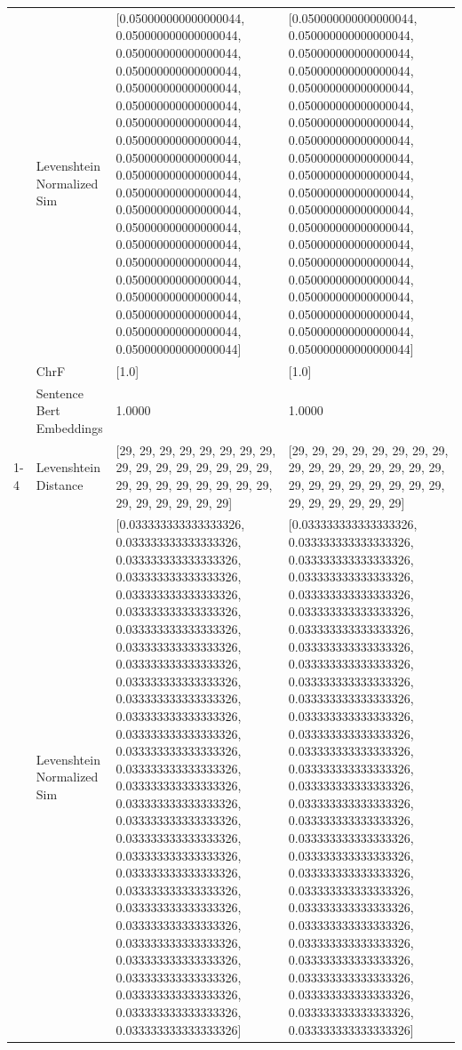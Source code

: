 \begin{tabular}{llll}
 & Levenshtein Normalized Sim & [0.050000000000000044, 0.050000000000000044, 0.050000000000000044, 0.050000000000000044, 0.050000000000000044, 0.050000000000000044, 0.050000000000000044, 0.050000000000000044, 0.050000000000000044, 0.050000000000000044, 0.050000000000000044, 0.050000000000000044, 0.050000000000000044, 0.050000000000000044, 0.050000000000000044, 0.050000000000000044, 0.050000000000000044, 0.050000000000000044, 0.050000000000000044, 0.050000000000000044] & [0.050000000000000044, 0.050000000000000044, 0.050000000000000044, 0.050000000000000044, 0.050000000000000044, 0.050000000000000044, 0.050000000000000044, 0.050000000000000044, 0.050000000000000044, 0.050000000000000044, 0.050000000000000044, 0.050000000000000044, 0.050000000000000044, 0.050000000000000044, 0.050000000000000044, 0.050000000000000044, 0.050000000000000044, 0.050000000000000044, 0.050000000000000044, 0.050000000000000044] \\
 & ChrF & [1.0] & [1.0] \\
 & Sentence Bert Embeddings & 1.0000 & 1.0000 \\
\cline{1-4}
\multirow[t]{4}{*}{Omwana omuya nigo ogosara engencho.} & Levenshtein Distance & [29, 29, 29, 29, 29, 29, 29, 29, 29, 29, 29, 29, 29, 29, 29, 29, 29, 29, 29, 29, 29, 29, 29, 29, 29, 29, 29, 29, 29, 29] & [29, 29, 29, 29, 29, 29, 29, 29, 29, 29, 29, 29, 29, 29, 29, 29, 29, 29, 29, 29, 29, 29, 29, 29, 29, 29, 29, 29, 29, 29] \\
 & Levenshtein Normalized Sim & [0.033333333333333326, 0.033333333333333326, 0.033333333333333326, 0.033333333333333326, 0.033333333333333326, 0.033333333333333326, 0.033333333333333326, 0.033333333333333326, 0.033333333333333326, 0.033333333333333326, 0.033333333333333326, 0.033333333333333326, 0.033333333333333326, 0.033333333333333326, 0.033333333333333326, 0.033333333333333326, 0.033333333333333326, 0.033333333333333326, 0.033333333333333326, 0.033333333333333326, 0.033333333333333326, 0.033333333333333326, 0.033333333333333326, 0.033333333333333326, 0.033333333333333326, 0.033333333333333326, 0.033333333333333326, 0.033333333333333326, 0.033333333333333326, 0.033333333333333326] & [0.033333333333333326, 0.033333333333333326, 0.033333333333333326, 0.033333333333333326, 0.033333333333333326, 0.033333333333333326, 0.033333333333333326, 0.033333333333333326, 0.033333333333333326, 0.033333333333333326, 0.033333333333333326, 0.033333333333333326, 0.033333333333333326, 0.033333333333333326, 0.033333333333333326, 0.033333333333333326, 0.033333333333333326, 0.033333333333333326, 0.033333333333333326, 0.033333333333333326, 0.033333333333333326, 0.033333333333333326, 0.033333333333333326, 0.033333333333333326, 0.033333333333333326, 0.033333333333333326, 0.033333333333333326, 0.033333333333333326, 0.033333333333333326, 0.033333333333333326] \\

\end{tabular}
